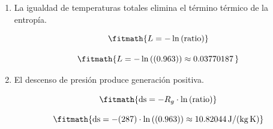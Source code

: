 \begin{enumerate}

\item La igualdad de temperaturas totales elimina el término térmico de la entropía.

\[\fitmath{L=-\ln\left(\mathrm{ratio}\right)}\]

\[\fitmath{L=-\ln\left((0.963)\right)\approx 0.03770187\,}\]

\item El descenso de presión produce generación positiva.

\[\fitmath{\mathrm{ds}=-R_g\cdot \ln\left(\mathrm{ratio}\right)}\]

\[\fitmath{\mathrm{ds}=-(287)\cdot \ln\left((0.963)\right)\approx 10.82044\,\mathrm{J/(kg\,K)}}\]

\end{enumerate}
